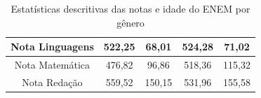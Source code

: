 \begin{table}[]
\begin{tabular}{ccccc}
    Nota Linguagens                                                     & 522,25 & 68,01                                                   & 524,28 & 71,02                                                   \\ \hline
    Nota Matemática                                                     & 476,82 & 96,86                                                   & 518,36 & 115,32                                                  \\ \hline
    Nota Redação                                                        & 559,52 & 150,15                                                  & 531,96 & 155,58                                                  \\ \hline
    \end{tabular}
    \caption{Estatísticas descritivas das notas e idade do ENEM por gênero}
    \label{tab:estatistica-nota-enem}
    \end{table}


